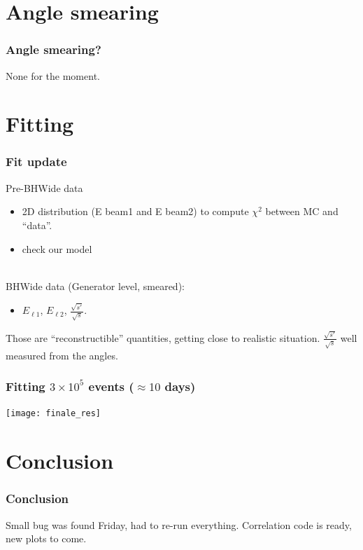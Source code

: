 \documentclass{beamer}
\begin{document}
\section{Angle smearing}
\begin{frame}
\frametitle{Angle smearing?}
None for the moment.
\end{frame}
\section{Fitting}
\begin{frame}
\frametitle{Fit update}
Pre-BHWide data 
\begin{itemize}
  \item 2D distribution (E beam1 and E beam2) to compute $\chi^2$
between MC and ``data''.
\item check our model
\end{itemize}
~\\
BHWide data (Generator level, smeared):
\begin{itemize}
  \item $E_{\ell1}$, $E_{\ell2}$, $\frac{\sqrt{s'}}{\sqrt{s}}$.
\end{itemize}
Those are ``reconstructible'' quantities, getting close to realistic situation.
$\frac{\sqrt{s'}}{\sqrt{s}}$ well measured from the angles.
\end{frame}
\begin{frame}
\frametitle{Fitting $3\times 10^5$ events ($\approx10$ days)}
\begin{center}
\texttt{[image: finale\_res]}
\end{center}
\end{frame}
\section{Conclusion}
\begin{frame}
\frametitle{Conclusion}
Small bug was found Friday, had to re-run everything. Correlation code is ready,
new plots to come.
\end{frame}
\end{document}
